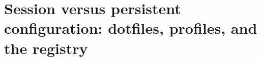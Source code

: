 \chapter{Session versus persistent configuration: dotfiles, profiles, and the registry}
\label{ch:session-versus-persistent-configuration}

